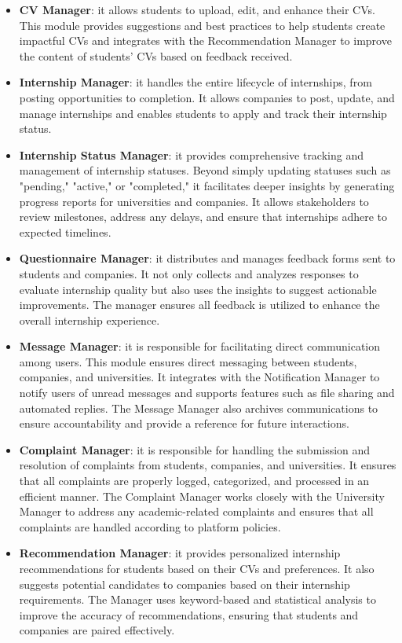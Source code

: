 \begin{itemize}
     \item \textbf{CV Manager}: it allows students to upload, edit, and enhance their CVs. This module provides suggestions and best practices to help students create impactful CVs and integrates with the Recommendation Manager to improve the content of students' CVs based on feedback received.
    \item \textbf{Internship Manager}: it handles the entire lifecycle of internships, from posting opportunities to completion. It allows companies to post, update, and manage internships and enables students to apply and track their internship status.
    \item \textbf{Internship Status Manager}: it provides comprehensive tracking and management of internship statuses. Beyond simply updating statuses such as "pending," "active," or "completed," it facilitates deeper insights by generating progress reports for universities and companies. It allows stakeholders to review milestones, address any delays, and ensure that internships adhere to expected timelines.
    \item \textbf{Questionnaire Manager}: it distributes and manages feedback forms sent to students and companies. It not only collects and analyzes responses to evaluate internship quality but also uses the insights to suggest actionable improvements. The manager ensures all feedback is utilized to enhance the overall internship experience.
    \item \textbf{Message Manager}: it is responsible for facilitating direct communication among users. This module ensures direct messaging between students, companies, and universities. It integrates with the Notification Manager to notify users of unread messages and supports features such as file sharing and automated replies. The Message Manager also archives communications to ensure accountability and provide a reference for future interactions.
    \item \textbf{Complaint Manager}: it is responsible for handling the submission and resolution of complaints from students, companies, and universities. It ensures that all complaints are properly logged, categorized, and processed in an efficient manner. The Complaint Manager works closely with the University Manager to address any academic-related complaints and ensures that all complaints are handled according to platform policies.
    \item \textbf{Recommendation Manager}: it provides personalized internship recommendations for students based on their CVs and preferences. It also suggests potential candidates to companies based on their internship requirements. The Manager uses keyword-based and statistical analysis to improve the accuracy of recommendations, ensuring that students and companies are paired effectively.

\end{itemize}
